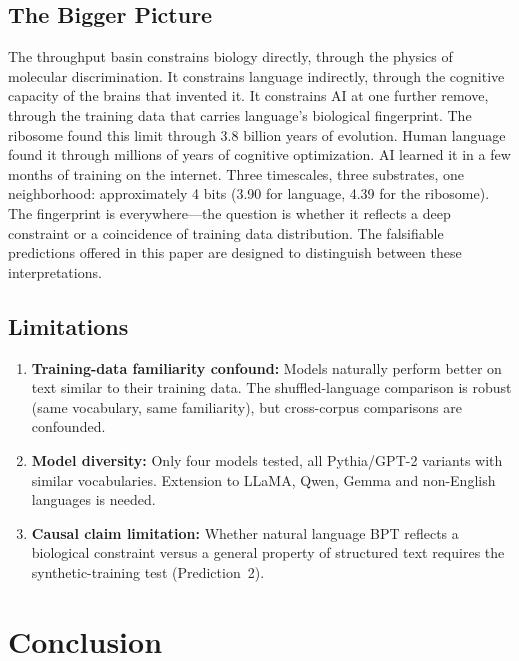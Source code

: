 \documentclass[11pt]{article}
\begin{document}
\subsection{The Bigger Picture}

The throughput basin constrains biology directly, through the physics of molecular discrimination. It constrains language indirectly, through the cognitive capacity of the brains that invented it. It constrains AI at one further remove, through the training data that carries language's biological fingerprint. The ribosome found this limit through 3.8 billion years of evolution. Human language found it through millions of years of cognitive optimization. AI learned it in a few months of training on the internet. Three timescales, three substrates, one neighborhood: approximately 4 bits (3.90 for language, 4.39 for the ribosome). The fingerprint is everywhere---the question is whether it reflects a deep constraint or a coincidence of training data distribution. The falsifiable predictions offered in this paper are designed to distinguish between these interpretations.

\subsection{Limitations}

\begin{enumerate}
\item \textbf{Training-data familiarity confound:} Models naturally perform better on text similar to their training data. The shuffled-language comparison is robust (same vocabulary, same familiarity), but cross-corpus comparisons are confounded.
\item \textbf{Model diversity:} Only four models tested, all Pythia/GPT-2 variants with similar vocabularies. Extension to LLaMA, Qwen, Gemma and non-English languages is needed.
\item \textbf{Causal claim limitation:} Whether natural language BPT reflects a biological constraint versus a general property of structured text requires the synthetic-training test (Prediction~2).
\end{enumerate}

\section{Conclusion}
\end{document}
